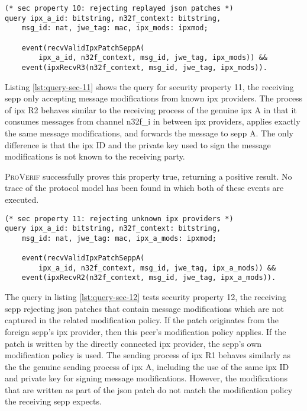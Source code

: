 \begin{lstlisting}[caption={Query for security property 10},label={lst:query-sec-10},firstnumber=221]
(* sec property 10: rejecting replayed json patches *)
query ipx_a_id: bitstring, n32f_context: bitstring,
    msg_id: nat, jwe_tag: mac, ipx_mods: ipxmod;

    event(recvValidIpxPatchSeppA(
        ipx_a_id, n32f_context, msg_id, jwe_tag, ipx_mods)) &&
    event(ipxRecvR3(n32f_context, msg_id, jwe_tag, ipx_mods)).
\end{lstlisting}

Listing \ref{lst:query-sec-11} shows the query for security property 11, the receiving \gls{sepp} only accepting message modifications from known \gls{ipx} providers.
The process of \gls{ipx} R2 behaves similar to the receiving process of the genuine \gls{ipx} A in that it consumes messages from channel {\sffamily n32f\_i} in between \gls{ipx} providers, applies exactly the same message modifications, and forwards the message to \gls{sepp} A.
The only difference is that the \gls{ipx} ID and the private key used to sign the message modifications is not known to the receiving party.

\textsc{ProVerif} successfully proves this property true, returning a positive result.
No trace of the protocol model has been found in which both of these events are executed.

\begin{lstlisting}[caption={Query for security property 11},label={lst:query-sec-11},firstnumber=221]
(* sec property 11: rejecting unknown ipx providers *)
query ipx_a_id: bitstring, n32f_context: bitstring,
    msg_id: nat, jwe_tag: mac, ipx_a_mods: ipxmod;

    event(recvValidIpxPatchSeppA(
        ipx_a_id, n32f_context, msg_id, jwe_tag, ipx_a_mods)) &&
    event(ipxRecvR2(n32f_context, msg_id, jwe_tag, ipx_a_mods)).
\end{lstlisting}

The query in listing \ref{lst:query-sec-12} tests security property 12, the receiving \gls{sepp} rejecting \gls{json} patches that contain message modifications which are not captured in the related modification policy.
If the patch originates from the foreign \gls{sepp}'s \gls{ipx} provider, then this peer's modification policy applies. If the patch is written by the directly connected \gls{ipx} provider, the \gls{sepp}'s own modification policy is used.
The sending process of \gls{ipx} R1 behaves similarly as the the genuine sending process of \gls{ipx} A, including the use of the same \gls{ipx} ID and private key for signing message modifications.
However, the modifications that are written as part of the \gls{json} patch do not match the modification policy the receiving \gls{sepp} expects.

